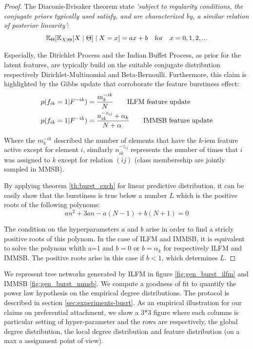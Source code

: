 \begin{proof}
The Diaconis-Ilvisaker theorem \cite{diaconis1979conjugate} state \emph{'subject to regularity conditions, the conjugate priors typically used satisfy, and are characterized by, a  similar relation of posterior linearity'}:
\begin{equation}
\mathbb{E}_\Theta[\mathbb{E}_{X|\Theta}[X\mid \Theta] \mid X=x] = ax+b \quad \textnormal{for} \quad x=0,1,2,... \nonumber
\end{equation}

Especially, the Dirichlet Process and the Indian Buffet Process, as prior for the latent features, are typically build on the suitable conjugate distribution respectively Dirichlet-Multinomial and Beta-Bernoulli. Furthermore, this claim is highlighted by the Gibbs update that corroborate the feature burstiness effect:
\begin{align} \label{eq:feat_up}
&\p(f_{ik} = 1 | F^{-ik}) = \frac{m_k^{-ik}}{N} \qquad \text{ILFM feature update} \nonumber \\
&\p(f_{ik} = 1 | F^{-ik}) = \frac{n_{ik}^{-z_{ij}}+\alpha_k}{N+\alpha_.} \qquad \text{IMMSB feature update} \nonumber \\
\end{align}

Where the $m_k^{-ik}$ described the number of elements that have the $k$-iem feature active except for element $i$, similarly $n_{ik}^{-z_{ij}}$ represents the number of times that $i$ was assigned to $k$ except for relation $(ij)$ (class membersehip are jointly sampled in MMSB).

By applying theorem \ref{th:burst_exch} for linear predictive distribution, it can be easily show that the burstiness is true below a number $L$ which is the positive roots of the following polynoms:
\begin{equation}
	 an^2 + 3an - a(N-1) + b(N+1) = 0
\end{equation}

The condition on the hyperparameters $a$ and $b$ arise in order to find a stricly positive roots of this polynom. In the case of ILFM and IMMSB, it is equivalent to solve the polynom whith a=1 and  $b=0$ or $b=\alpha_k$ for respectively ILFM and IMMSB. The positive roots arise in this case if $b < 1$, which determines $L$.
\end{proof}

We represent tree networks generated by ILFM in figure \ref{fig:gen_burst_ilfm} and IMMSB \ref{fig:gen_burst_mmsb}. We compute a goodness of fit to quantify the power law hypothesis on the empirical degree distributions. The protocol is described in section \ref{sec:experiments-busrt}. As an empirical illustration for our claims on preferential attachment, we show a 3*3 figure where each columns is particular setting of hyper-parameter and the rows are respectively, the global degree distribution, the local degree distribution and feature distribution (on a max a assignment point of view).

